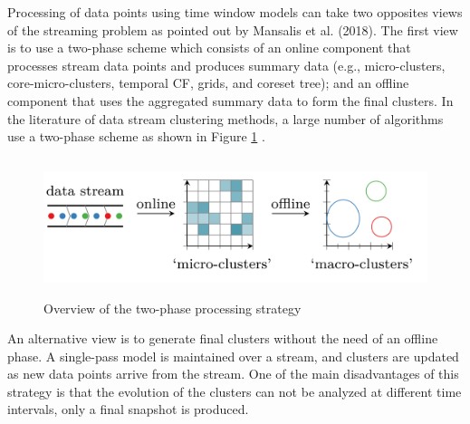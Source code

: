 



Processing of data points using time window models can take two opposites views of the streaming problem as pointed out by Mansalis et al. (2018). The first view is to use a two-phase scheme which consists of an online component that processes stream data points and produces summary data  (e.g., micro-clusters, core-micro-clusters, temporal CF, grids, and coreset tree); and an offline component that uses the aggregated summary data to form the final clusters. In the literature of data stream clustering methods, a large number of algorithms use a two-phase scheme as shown in Figure \ref{2phase} . 

\begin{figure}
\centering
\includegraphics[width = 15cm,height = 4cm]{image/Chapters/Chapter2/2phase.png}
\caption{Overview of the two-phase processing strategy \protect\cite{carnein2019optimizing}}
\label{2phase}
\end{figure}

An alternative view is to generate final clusters without the need of an offline phase. A single-pass model is maintained over a stream, and clusters are updated as new data points arrive from the stream. One of the main disadvantages of this strategy is that the evolution of the clusters can not be analyzed at different time intervals, only a final snapshot is produced.     

